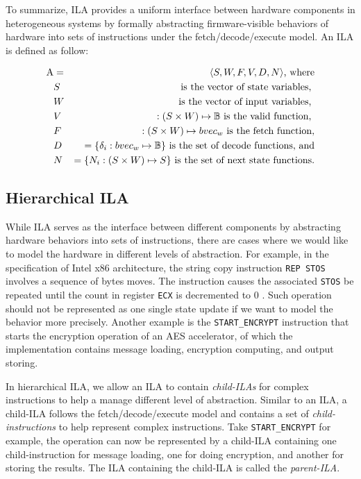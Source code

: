 \documentclass[letterpaper, 11 pt]{article}  %
\begin{document}
To summarize, ILA provides a uniform interface between hardware components 
in heterogeneous systems by formally abstracting firmware-visible behaviors of 
hardware into sets of instructions under the fetch/decode/execute model. 
An ILA is defined as follow:

\begin{eqnarray}
  \mathrm{A} &=& \langle S, W, F, V, D, N \rangle \text{, where} \nonumber \\
      &S& \text{ is the vector of state variables, } \nonumber \\
      &W& \text{ is the vector of input variables, } \nonumber \\
      &V& :(S\times W) \mapsto \mathbb{B} \text{ is the valid function, } \nonumber \\
      &F& :(S\times W) \mapsto bvec_w \text{ is the fetch function,} \nonumber \\
      &D& = \{ \delta_i : bvec_w \mapsto \mathbb{B} \} 
            \text{ is the set of decode functions, and} \nonumber \\
      &N& = \{ N_i : (S \times W) \mapsto S \} 
            \text{ is the set of next state functions.} \nonumber
\end{eqnarray}

\subsection*{Hierarchical ILA}
While ILA serves as the interface between different components by 
abstracting hardware behaviors into sets of instructions, there are cases where
we would like to model the hardware in different levels of abstraction.
For example, in the specification of Intel x86 architecture, the string copy 
instruction \texttt{REP STOS} involves a sequence of bytes moves.
The instruction causes the associated \texttt{STOS} be repeated until the count
in register \texttt{ECX} is decremented to $0$ \cite{intel-manual}.
Such operation should not be represented as one single state update if we want to
model the behavior more precisely.
Another example is the \texttt{START\_ENCRYPT} instruction that starts the 
encryption operation of an AES accelerator, of which the implementation contains 
message loading, encryption computing, and output storing.

In hierarchical ILA, we allow an ILA to contain \textit{child-ILAs} for complex
instructions to help a manage different level of abstraction.
Similar to an ILA, a child-ILA follows the fetch/decode/execute model and 
contains a set of \textit{child-instructions} to help represent complex 
instructions.
Take \texttt{START\_ENCRYPT} for example, the operation can now be represented by 
a child-ILA containing one child-instruction for message loading, one for doing 
encryption, and another for storing the results.
The ILA containing the child-ILA is called the \textit{parent-ILA}.
\end{document}
